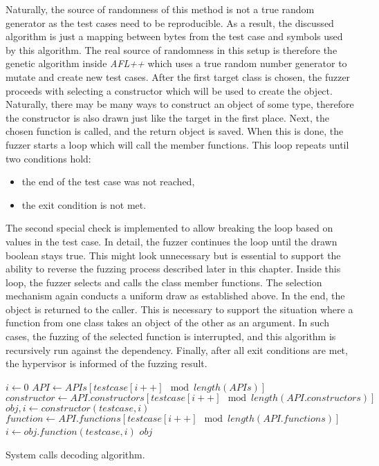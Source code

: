 Naturally, the source of randomness of this method is not a true random generator as the test cases need to be reproducible. As a result, the discussed algorithm is just a mapping between bytes from the test case and symbols used by this algorithm. The real source of randomness in this setup is therefore the genetic algorithm inside \textit{AFL++} which uses a true random number generator to mutate and create new test cases. After the first target class is chosen, the fuzzer proceeds with selecting a constructor which will be used to create the object. Naturally, there may be many ways to construct an object of some type, therefore the constructor is also drawn just like the target in the first place. Next, the chosen function is called, and the return object is saved. When this is done, the fuzzer starts a loop which will call the member functions. This loop repeats until two conditions hold:
\begin{itemize}
    \item the end of the test case was not reached,
    \item the exit condition is not met.
\end{itemize}
The second special check is implemented to allow breaking the loop based on values in the test case. In detail, the fuzzer continues the loop until the drawn boolean stays true. This might look unnecessary but is essential to support the ability to reverse the fuzzing process described later in this chapter. Inside this loop, the fuzzer selects and calls the class member functions. The selection mechanism again conducts a uniform draw as established above. In the end, the object is returned to the caller. This is necessary to support the situation where a function from one class takes an object of the other as an argument. In such cases, the fuzzing of the selected function is interrupted, and this algorithm is recursively run against the dependency. Finally, after all exit conditions are met, the hypervisor is informed of the fuzzing result.

\begin{algorithm}
    \begin{algorithmic}
        \State $i \gets 0$
        \State $API \gets APIs[testcase[i++] \mod length(APIs)]$
        \State $constructor \gets API.constructors[testcase[i++] \mod length(API.constructors)]$
        \State $obj, i \gets constructor(testcase, i)$
            \State $function \gets API.functions[testcase[i++] \mod length(API.functions)]$
            \State $i \gets obj.function(testcase, i)$
        \EndWhile
        \State \Return $obj$
    \end{algorithmic}
    \caption{System calls decoding algorithm.}
    \label{alg:syscall_decode}
\end{algorithm}

